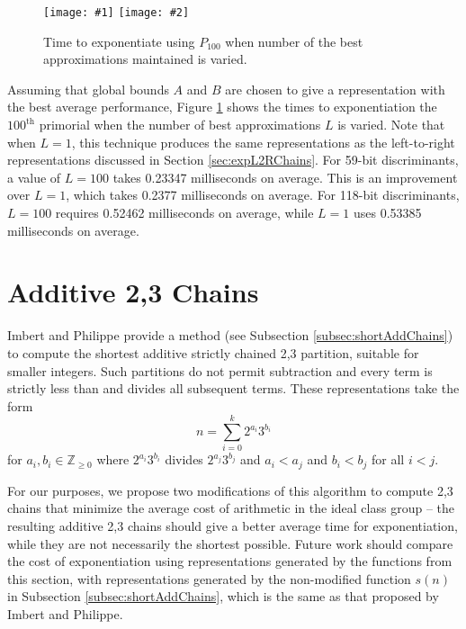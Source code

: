 \documentclass{ucalgthes1}
\theoremstyle{definition}
\newcommand{\ZZgez}{\mathbb{Z}_{\ge 0}}
\newcommand{\mygraphTwoX}[5]{
	\begin{figure}[htb]
	\centering
	\texttt{[image: \#1]}
	\texttt{[image: \#2]}
	\caption[#5]{#4}
	\label{#3}
	\end{figure}
}
\begin{document}
\mygraphTwoX{dbns_l2r_tree_vary-64}{dbns_l2r_tree_vary-128}{fig:expL2RBestVary}{Time to exponentiate using $P_100$ when number of the best approximations maintained is varied.}{Varying the Number of Best Approximations.}

Assuming that global bounds $A$ and $B$ are chosen to give a representation with the best average performance, Figure \ref{fig:expL2RBestVary} shows the times to exponentiation the $100^{\textrm{th}}$ primorial when the number of best approximations $L$ is varied.   Note that when $L=1$, this technique produces the same representations as the left-to-right representations discussed in Section \ref{sec:expL2RChains}.  For 59-bit discriminants, a value of $L=100$ takes 0.23347 milliseconds on average.  This is an improvement over $L=1$, which takes 0.2377 milliseconds on average.  For 118-bit discriminants, $L=100$ requires 0.52462 milliseconds on average, while $L=1$ uses 0.53385 milliseconds on average.


\section{Additive 2,3 Chains}
\label{sec:expAddChains}

Imbert and Philippe \cite[\S 3]{Imbert2010b} provide a method (see Subsection \ref{subsec:shortAddChains}) to compute the shortest additive strictly chained 2,3 partition, suitable for smaller integers.  Such partitions do not permit subtraction and every term is strictly less than and divides all subsequent terms. These representations take the form
\[
	n = \sum_{i=0}^k 2^{a_i}3^{b_i}
\]
for $a_i, b_i \in \ZZgez$ where $2^{a_i}3^{b_i}$ divides $2^{a_j}3^{b_j}$ and $a_i < a_j$ and $b_i < b_j$ for all $i < j$.

For our purposes, we propose two modifications of this algorithm to compute 2,3 chains that minimize the average cost of arithmetic in the ideal class group -- the resulting additive 2,3 chains should give a better average time for exponentiation, while they are not necessarily the shortest possible.  Future work should compare the cost of exponentiation using representations generated by the functions from this section, with representations generated by the non-modified function $s(n)$ in Subsection \ref{subsec:shortAddChains}, which is the same as that proposed by Imbert and Philippe.
\end{document}
